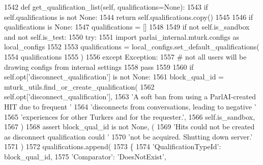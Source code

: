 \begin{DoxyCode}
1542     \textcolor{keyword}{def }get\_qualification\_list(self, qualifications=None):
1543         \textcolor{keywordflow}{if} self.qualifications \textcolor{keywordflow}{is} \textcolor{keywordflow}{not} \textcolor{keywordtype}{None}:
1544             \textcolor{keywordflow}{return} self.qualifications.copy()
1545 
1546         \textcolor{keywordflow}{if} qualifications \textcolor{keywordflow}{is} \textcolor{keywordtype}{None}:
1547             qualifications = []
1548 
1549         \textcolor{keywordflow}{if} \textcolor{keywordflow}{not} self.is\_sandbox \textcolor{keywordflow}{and} \textcolor{keywordflow}{not} self.is\_test:
1550             \textcolor{keywordflow}{try}:
1551                 \textcolor{keyword}{import} parlai\_internal.mturk.configs \textcolor{keyword}{as} local\_configs
1552 
1553                 qualifications = local\_configs.set\_default\_qualifications(
1554                     qualifications
1555                 )
1556             \textcolor{keywordflow}{except} Exception:
1557                 \textcolor{comment}{# not all users will be drawing configs from internal settings}
1558                 \textcolor{keywordflow}{pass}
1559 
1560         \textcolor{keywordflow}{if} self.opt[\textcolor{stringliteral}{'disconnect\_qualification'}] \textcolor{keywordflow}{is} \textcolor{keywordflow}{not} \textcolor{keywordtype}{None}:
1561             block\_qual\_id = mturk\_utils.find\_or\_create\_qualification(
1562                 self.opt[\textcolor{stringliteral}{'disconnect\_qualification'}],
1563                 \textcolor{stringliteral}{'A soft ban from using a ParlAI-created HIT due to frequent '}
1564                 \textcolor{stringliteral}{'disconnects from conversations, leading to negative '}
1565                 \textcolor{stringliteral}{'experiences for other Turkers and for the requester.'},
1566                 self.is\_sandbox,
1567             )
1568             \textcolor{keyword}{assert} block\_qual\_id \textcolor{keywordflow}{is} \textcolor{keywordflow}{not} \textcolor{keywordtype}{None}, (
1569                 \textcolor{stringliteral}{'Hits could not be created as disconnect qualification could '}
1570                 \textcolor{stringliteral}{'not be acquired. Shutting down server.'}
1571             )
1572             qualifications.append(
1573                 \{
1574                     \textcolor{stringliteral}{'QualificationTypeId'}: block\_qual\_id,
1575                     \textcolor{stringliteral}{'Comparator'}: \textcolor{stringliteral}{'DoesNotExist'},

\end{DoxyCode}
